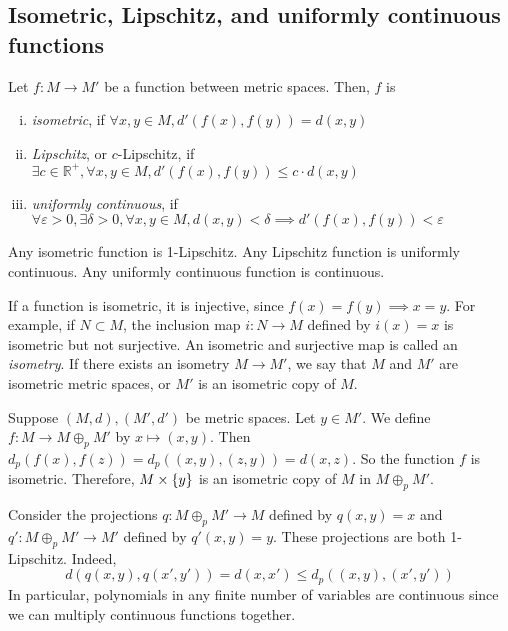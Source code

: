 \subsection{Isometric, Lipschitz, and uniformly continuous functions}
\begin{definition}
	Let \( f \colon M \to M' \) be a function between metric spaces.
	Then, \( f \) is
	\begin{enumerate}[(i)]
		\item \textit{isometric}, if \( \forall x,y \in M, d'(f(x),f(y)) = d(x,y) \)
		\item \textit{Lipschitz}, or \( c \)-Lipschitz, if \( \exists c \in \mathbb R^+, \forall x,y \in M, d'(f(x),f(y)) \leq c\cdot d(x,y) \)
		\item \textit{uniformly continuous}, if \( \forall \varepsilon > 0, \exists \delta > 0, \forall x,y \in M, d(x,y) < \delta \implies d'(f(x), f(y)) < \varepsilon \)
	\end{enumerate}
\end{definition}
\begin{remark}
	Any isometric function is 1-Lipschitz.
	Any Lipschitz function is uniformly continuous.
	Any uniformly continuous function is continuous.
\end{remark}
\begin{remark}
	If a function is isometric, it is injective, since \( f(x) = f(y) \implies x = y \).
	For example, if \( N \subset M \), the inclusion map \( i \colon N \to M \) defined by \( i(x) = x \) is isometric but not surjective.
	An isometric and surjective map is called an \textit{isometry}.
	If there exists an isometry \( M \to M' \), we say that \( M \) and \( M' \) are isometric metric spaces, or \( M' \) is an isometric copy of \( M \).
\end{remark}
\begin{example}
	Suppose \( (M, d), (M', d') \) be metric spaces.
	Let \( y \in M' \).
	We define \( f \colon M \to M \oplus_p M' \) by \( x \mapsto (x,y) \).
	Then \( d_p(f(x),f(z)) = d_p((x,y), (z,y)) = d(x,z) \).
	So the function \( f \) is isometric.
	Therefore, \( M \times \qty{ y } \) is an isometric copy of \( M \) in \( M \oplus_p M' \).
\end{example}
\begin{example}
	Consider the projections \( q \colon M \oplus_p M' \to M \) defined by \( q(x,y) = x \) and \( q' \colon M \oplus_p M' \to M' \) defined by \( q'(x,y) = y \).
	These projections are both 1-Lipschitz.
	Indeed,
	\[
		d(q(x,y), q(x',y')) = d(x,x') \leq d_p((x,y), (x',y'))
	\]
	In particular, polynomials in any finite number of variables are continuous since we can multiply continuous functions together.
\end{example}
